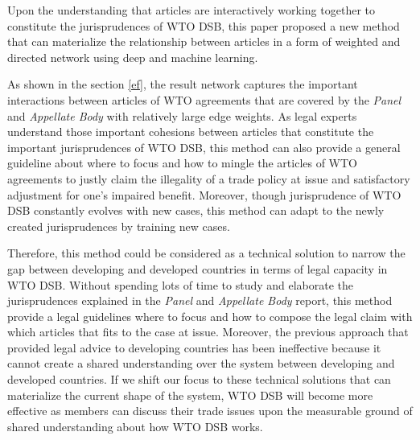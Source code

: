Upon the understanding that articles are interactively working together to
constitute the jurisprudences of WTO DSB,
this paper proposed a new method that can materialize the relationship between articles
in a form of weighted and directed network using deep and machine learning.
 
As shown in the section \ref{ef}, the result network captures the important interactions
between articles of WTO agreements that are covered by the \textit{Panel} and \textit{Appellate Body} with relatively large edge weights.
As legal experts understand those important cohesions between articles that constitute the important jurisprudences of WTO DSB,
this method can also provide a general guideline about where to focus and how to mingle the articles of WTO agreements to justly claim
the illegality of a trade policy at issue and satisfactory adjustment for one's impaired benefit. Moreover, though jurisprudence of WTO DSB constantly
evolves with new cases, this method can adapt to the newly created jurisprudences by training new cases.
 
Therefore, this method could be considered as a technical solution to narrow the gap between developing and developed countries in terms of legal capacity in WTO DSB.
Without spending lots of time to study and elaborate the jurisprudences explained in the \textit{Panel} and \textit{Appellate Body} report, this method provide a legal guidelines where to focus and how to compose the legal claim with which articles that fits to the case at issue.
Moreover, the previous approach that provided legal advice to developing countries has been ineffective because it cannot create a shared understanding over the system between developing and developed countries.
If we shift our focus to these technical solutions that can materialize the current shape of the system, WTO DSB
will become more effective as members can discuss their trade issues upon the measurable ground of shared understanding about how WTO DSB works.
 
 
 
 
 
 
 
 
 
 

